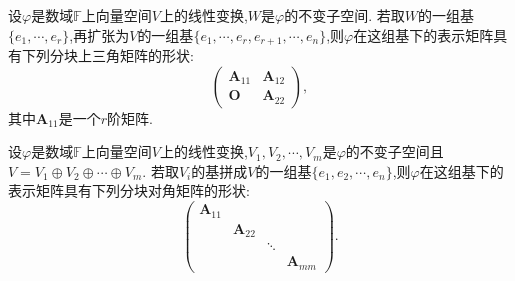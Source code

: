 \documentclass[lang=cn,newtx,10pt,scheme=chinese]{elegantbook}
\begin{document}
\begin{theorem}\label{theorem:在不变子空间基下的矩阵}
    设\(\varphi\)是数域\(\mathbb{F}\)上向量空间\(V\)上的线性变换,\(W\)是\(\varphi\)的不变子空间. 若取\(W\)的一组基\(\{e_1,\cdots,e_r\}\),再扩张为\(V\)的一组基\(\{e_1,\cdots,e_r,e_{r + 1},\cdots,e_n\}\),则\(\varphi\)在这组基下的表示矩阵具有下列分块上三角矩阵的形状:
    \[
    \begin{pmatrix}
    \boldsymbol{A}_{11}&\boldsymbol{A}_{12}\\
    \boldsymbol{O}&\boldsymbol{A}_{22}
    \end{pmatrix},
    \]
    其中\(\boldsymbol{A}_{11}\)是一个\(r\)阶矩阵.
    \end{theorem}
    
    \begin{theorem}\label{theorem:在直和的基下的矩阵}
    设\(\varphi\)是数域\(\mathbb{F}\)上向量空间\(V\)上的线性变换,\(V_1,V_2,\cdots,V_m\)是\(\varphi\)的不变子空间且\(V = V_1\oplus V_2\oplus\cdots\oplus V_m\). 若取\(V_i\)的基拼成\(V\)的一组基\(\{e_1,e_2,\cdots,e_n\}\),则\(\varphi\)在这组基下的表示矩阵具有下列分块对角矩阵的形状:
    \[
    \begin{pmatrix}
    \boldsymbol{A}_{11}&&&\\
    &\boldsymbol{A}_{22}&&\\
    &&\ddots&\\
    &&&\boldsymbol{A}_{mm}
    \end{pmatrix}.
    \]
\end{theorem}
\end{document}
